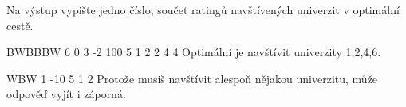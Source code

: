 
Na výstup vypište jedno číslo, součet ratingů navštívených univerzit v optimální cestě.



BWBBBW
6 0 3 -2 100 5
1 2 2 4 4
\sampleCOMMENT
Optimální je navštívit univerzity 1,2,4,6.
\sampleEND

\bigskip

WBW
1 -10 5
1 2
\sampleCOMMENT
Protože musiš navštívit alespoň nějakou univerzitu, může odpověď vyjít i záporná.
\sampleEND


